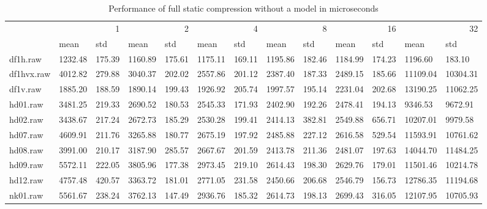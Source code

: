 \begin{table}
\caption{Performance of full static compression without a model in microseconds}
\begin{tabular}{lllllllllllll}
 & \multicolumn{2}{r}{1} & \multicolumn{2}{r}{2} & \multicolumn{2}{r}{4} & \multicolumn{2}{r}{8} & \multicolumn{2}{r}{16} & \multicolumn{2}{r}{32} \\
 & mean & std & mean & std & mean & std & mean & std & mean & std & mean & std \\
df1h.raw & 1232.48 & 175.39 & 1160.89 & 175.61 & 1175.11 & 169.11 & 1195.86 & 182.46 & 1184.99 & 174.23 & 1196.60 & 183.10 \\
df1hvx.raw & 4012.82 & 279.88 & 3040.37 & 202.02 & 2557.86 & 201.12 & 2387.40 & 187.33 & 2489.15 & 185.66 & 11109.04 & 10304.31 \\
df1v.raw & 1885.20 & 188.59 & 1890.14 & 199.43 & 1926.92 & 205.74 & 1997.57 & 195.14 & 2231.04 & 202.68 & 13190.25 & 11062.25 \\
hd01.raw & 3481.25 & 219.33 & 2690.52 & 180.53 & 2545.33 & 171.93 & 2402.90 & 192.26 & 2478.41 & 194.13 & 9346.53 & 9672.91 \\
hd02.raw & 3438.67 & 217.24 & 2672.73 & 185.29 & 2530.28 & 199.41 & 2414.13 & 382.81 & 2549.88 & 656.71 & 10207.01 & 9979.58 \\
hd07.raw & 4609.91 & 211.76 & 3265.88 & 180.77 & 2675.19 & 197.92 & 2485.88 & 227.12 & 2616.58 & 529.54 & 11593.91 & 10761.62 \\
hd08.raw & 3991.00 & 210.17 & 3187.90 & 285.57 & 2667.67 & 201.59 & 2413.78 & 211.36 & 2481.07 & 197.63 & 14044.70 & 11484.25 \\
hd09.raw & 5572.11 & 222.05 & 3805.96 & 177.38 & 2973.45 & 219.10 & 2614.43 & 198.30 & 2629.76 & 179.01 & 11501.46 & 10214.78 \\
hd12.raw & 4757.48 & 420.57 & 3363.72 & 181.01 & 2771.05 & 231.58 & 2450.66 & 206.68 & 2546.79 & 156.73 & 12786.35 & 11194.68 \\
nk01.raw & 5561.67 & 238.24 & 3762.13 & 147.49 & 2936.76 & 185.32 & 2614.73 & 198.13 & 2699.43 & 316.05 & 12107.95 & 10705.93 \\
\end{tabular}
\end{table}
